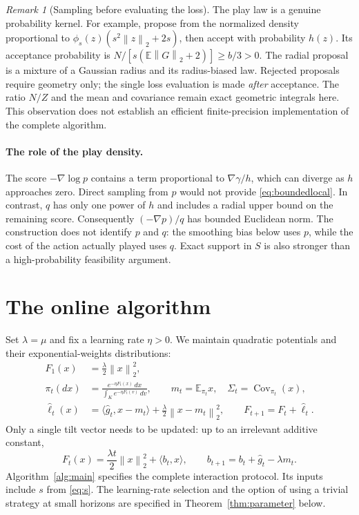 \documentclass[11pt]{article}
\numberwithin{equation}{section}
\newcommand{\E}{\mathbb E}
\newcommand{\Cov}{\operatorname{Cov}}
\newcommand{\ip}[2]{\langle #1,#2\rangle}
\newcommand{\norm}[1]{\left\|#1\right\|}
\newcounter{algorithm}
\theoremstyle{definition}
\theoremstyle{remark}
\newtheorem{remark}[theorem]{Remark}
\begin{document}
\begin{remark}[Sampling before evaluating the loss]
The play law is a genuine probability kernel. For example, propose from the
normalized density proportional to
$\phi_s(z)(s^2\norm z_2+2s)$, then accept with probability $h(z)$.
Its acceptance probability is $N/[s(\E\norm G_2+2)]\geq b/3>0$.
The radial proposal is a mixture of a Gaussian radius and its radius-biased
law. Rejected proposals require geometry only; the single loss evaluation is
made \emph{after} acceptance. The ratio $N/Z$ and the mean and covariance
remain exact geometric integrals here. This observation does not establish
an efficient finite-precision implementation of the complete algorithm.
\end{remark}


\paragraph{The role of the play density.}
The score $-\nabla\log p$ contains a term proportional to
$\nabla\gamma/h$, which can diverge as $h$ approaches zero. Direct sampling
from $p$ would not provide \eqref{eq:boundedlocal}. In contrast, $q$ has only
one power of $h$ and includes a radial upper bound on the remaining score.
Consequently $(-\nabla p)/q$ has bounded Euclidean norm. The construction does
not identify $p$ and $q$: the smoothing bias below uses $p$, while the cost of
the action actually played uses $q$. Exact support in $S$ is also stronger
than a high-probability feasibility argument.

\section{The online algorithm}\label{sec:algorithm}
Set $\lambda=\mu$ and fix a learning rate $\eta>0$. We maintain quadratic
potentials and their exponential-weights distributions:
\begin{align}
 F_1(x)&=\frac\lambda2\norm{x}_2^2,\label{eq:F1}\\
 \pi_t(dx)&=\frac{e^{-\eta F_t(x)}\,dx}{\int_K e^{-\eta F_t(v)}\,dv},
 \qquad m_t=\E_{\pi_t}x,\quad\Sigma_t=\Cov_{\pi_t}(x),\label{eq:pi}\\
 \widehat\ell_t(x)&=\ip{\widehat g_t}{x-m_t}
                  +\frac\lambda2\norm{x-m_t}_2^2,
 \qquad F_{t+1}=F_t+\widehat\ell_t.\label{eq:update}
\end{align}
Only a single tilt vector needs to be updated: up to an irrelevant
additive constant,
\[
 F_t(x)=\frac{\lambda t}{2}\norm{x}_2^2+\ip{b_t}x,
 \qquad b_{t+1}=b_t+\widehat g_t-\lambda m_t.
\]
Algorithm~\ref{alg:main} specifies the complete interaction protocol. Its inputs
include $s$ from \eqref{eq:s}. The learning-rate selection and the option of
using a trivial strategy at small horizons are specified in
Theorem~\ref{thm:parameter} below.
\end{document}
